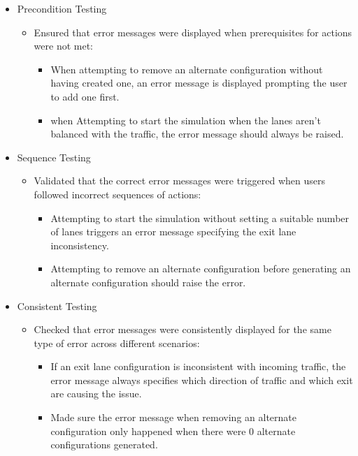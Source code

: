 \documentclass{article}
\begin{document}
        \begin{itemize}
            \item Precondition Testing
            \begin{itemize}
                \item Ensured that error messages were displayed when prerequisites for actions were not met:
                \begin{itemize}
                    \item When attempting to remove an alternate configuration without having created one, an error message is displayed prompting the user to add one first.
                    \item when Attempting to start the simulation when the lanes aren't balanced with the traffic, the error message should always be raised.
                \end{itemize}
            \end{itemize}
            \item Sequence Testing
            \begin{itemize}
                \item Validated that the correct error messages were triggered when users followed incorrect sequences of actions:
                \begin{itemize}
                    \item Attempting to start the simulation without setting a suitable number of lanes triggers an error message specifying the exit lane inconsistency.
                    \item Attempting to remove an alternate configuration before generating an alternate configuration should raise the error.
                \end{itemize}
            \end{itemize}
            \item Consistent Testing
            \begin{itemize}
                \item Checked that error messages were consistently displayed for the same type of error across different scenarios:
                \begin{itemize}
                    \item If an exit lane configuration is inconsistent with incoming traffic, the error message always specifies which direction of traffic and which exit are causing the issue.
                    \item Made sure the error message when removing an alternate configuration only happened when there were 0 alternate configurations generated.
                \end{itemize}
            \end{itemize}
        \end{itemize}
\end{document}
